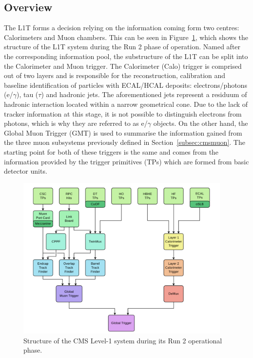  \subsection{Overview}
 \label{l1:TTs}
 \hspace{10pt} The L1T forms a decision relying on the information coming form two centres: Calorimeters and Muon chambers. This can be seen in Figure~\ref{fig:l1_structure}, which shows the structure of the L1T system during the Run 2 phase of operation. Named after the corresponding information pool, the substructure of the L1T can be split into the Calorimeter and Muon trigger. The Calorimeter (Calo) trigger is comprised out of two layers and is responsible for the reconstruction, calibration and baseline identification of particles with ECAL/HCAL deposits: electrons/photons (e/$\gamma$), tau ($\tau$) and hadronic jets. The aforementioned jets represent a residuum of hadronic interaction located within a narrow geometrical cone. Due to the lack of tracker information at this stage, it is not possible to distinguish electrons from photons, which is why they are referred to as e/$\gamma$ objects. On the other hand, the Global Muon Trigger (GMT) is used to summarise the information gained from the three muon subsystems previously defined in Section~\ref{subsec:cmsmuon}. The starting point for both of these triggers is the same and comes from the information provided by the trigger primitives (TPs) which are formed from basic detector units.
\begin{figure}[htbp]
  \centering
    \includegraphics[width=0.95\textwidth]{CMS_experiment/L1_diagram.png}
  \caption{Structure of the CMS Level-1 system during its Run 2 operational phase.~\cite{cms:l1_paper}}
  \label{fig:l1_structure}
\end{figure}

